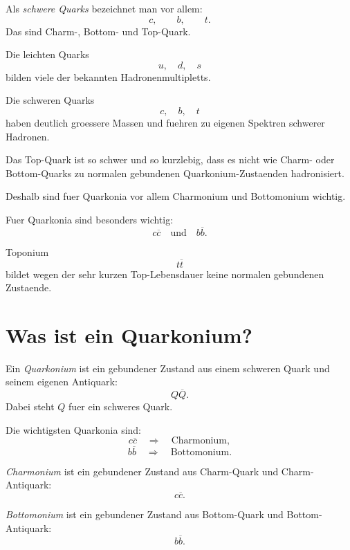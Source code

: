 \begin{definitionbox}
Als \emph{schwere Quarks} bezeichnet man vor allem:
\[
    c,\qquad b,\qquad t.
\]
Das sind Charm-, Bottom- und Top-Quark.
\end{definitionbox}

\begin{conceptbox}
Die leichten Quarks
\[
    u,\quad d,\quad s
\]
bilden viele der bekannten Hadronenmultipletts.

Die schweren Quarks
\[
    c,\quad b,\quad t
\]
haben deutlich groessere Massen und fuehren zu eigenen Spektren schwerer Hadronen.
\end{conceptbox}

\begin{notebox}
Das Top-Quark ist so schwer und so kurzlebig, dass es nicht wie Charm- oder
Bottom-Quarks zu normalen gebundenen Quarkonium-Zustaenden hadronisiert.

Deshalb sind fuer Quarkonia vor allem Charmonium und Bottomonium wichtig.
\end{notebox}

\begin{examtipbox}
Fuer Quarkonia sind besonders wichtig:
\[
    c\overline{c}
    \quad\text{und}\quad
    b\overline{b}.
\]

Toponium
\[
    t\overline{t}
\]
bildet wegen der sehr kurzen Top-Lebensdauer keine normalen gebundenen Zustaende.
\end{examtipbox}

\section{Was ist ein Quarkonium?}

\begin{definitionbox}
Ein \emph{Quarkonium} ist ein gebundener Zustand aus einem schweren Quark und seinem
eigenen Antiquark:
\[
    Q\overline{Q}.
\]
Dabei steht $Q$ fuer ein schweres Quark.
\end{definitionbox}

\begin{conceptbox}
Die wichtigsten Quarkonia sind:
\[
    c\overline{c}
    \quad\Rightarrow\quad
    \text{Charmonium},
\]
\[
    b\overline{b}
    \quad\Rightarrow\quad
    \text{Bottomonium}.
\]
\end{conceptbox}

\begin{definitionbox}
\emph{Charmonium} ist ein gebundener Zustand aus Charm-Quark und Charm-Antiquark:
\[
    c\overline{c}.
\]

\emph{Bottomonium} ist ein gebundener Zustand aus Bottom-Quark und Bottom-Antiquark:
\[
    b\overline{b}.
\]
\end{definitionbox}

